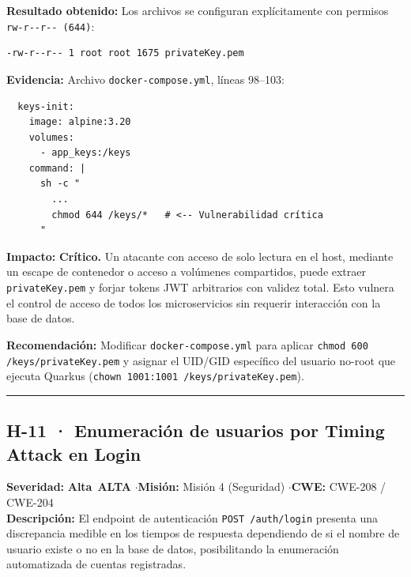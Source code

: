\documentclass[10pt,a4paper]{article}
\newcommand{\code}[1]{\nolinkurl{#1}}
\newcommand{\badgeAlta}{\colorbox{orange!20}{\textcolor{orange!90!black}{\textbf{\footnotesize Alta}}}}
\begin{document}
\noindent\textbf{Resultado obtenido:}
Los archivos se configuran explícitamente con permisos \code{rw-r--r-- (644)}:
\begin{tcolorbox}[colback=codebg,colframe=gray!40,arc=1mm]\small
\begin{verbatim}
-rw-r--r-- 1 root root 1675 privateKey.pem
\end{verbatim}
\end{tcolorbox}

\noindent\textbf{Evidencia:}
Archivo \code{docker-compose.yml}, líneas 98--103:
\begin{tcolorbox}[colback=codebg,colframe=gray!40,arc=1mm]\small
\begin{verbatim}
  keys-init:
    image: alpine:3.20
    volumes:
      - app_keys:/keys
    command: |
      sh -c "
        ...
        chmod 644 /keys/*   # <-- Vulnerabilidad crítica
      "
\end{verbatim}
\end{tcolorbox}

\noindent\textbf{Impacto:}
\textbf{Crítico.} Un atacante con acceso de solo lectura en el host, mediante un escape de contenedor o acceso a volúmenes compartidos, puede extraer \code{privateKey.pem} y forjar tokens JWT arbitrarios con validez total. Esto vulnera el control de acceso de todos los microservicios sin requerir interacción con la base de datos.

\noindent\textbf{Recomendación:}
Modificar \code{docker-compose.yml} para aplicar \code{chmod 600 /keys/privateKey.pem} y asignar el UID/GID específico del usuario no-root que ejecuta Quarkus (\code{chown 1001:1001 /keys/privateKey.pem}).

\vspace{0.8em}
\hrule
\vspace{0.8em}

\subsection{H-11 · Enumeración de usuarios por Timing Attack en Login}
\noindent\textbf{Severidad:} \badgeAlta\ \textbf{ALTA} \quad$\cdot$\quad \textbf{Misión:} Misión 4 (Seguridad) \quad$\cdot$\quad \textbf{CWE:} CWE-208 / CWE-204\\[0.3em]

\noindent\textbf{Descripción:}
El endpoint de autenticación \code{POST /auth/login} presenta una discrepancia medible en los tiempos de respuesta dependiendo de si el nombre de usuario existe o no en la base de datos, posibilitando la enumeración automatizada de cuentas registradas.
\end{document}
